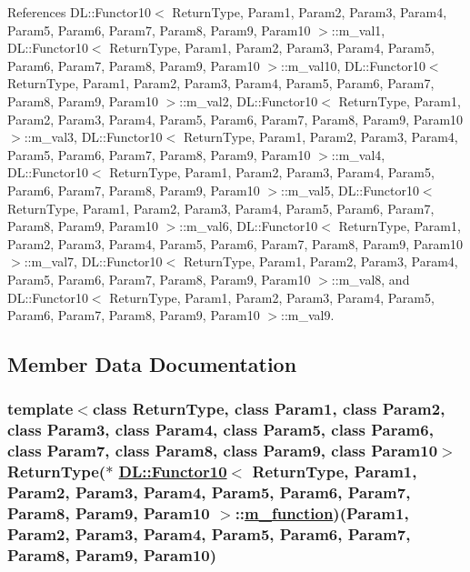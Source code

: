 References DL::Functor10$<$ Return\-Type, Param1, Param2, Param3, Param4, Param5, Param6, Param7, Param8, Param9, Param10 $>$::m\_\-val1, DL::Functor10$<$ Return\-Type, Param1, Param2, Param3, Param4, Param5, Param6, Param7, Param8, Param9, Param10 $>$::m\_\-val10, DL::Functor10$<$ Return\-Type, Param1, Param2, Param3, Param4, Param5, Param6, Param7, Param8, Param9, Param10 $>$::m\_\-val2, DL::Functor10$<$ Return\-Type, Param1, Param2, Param3, Param4, Param5, Param6, Param7, Param8, Param9, Param10 $>$::m\_\-val3, DL::Functor10$<$ Return\-Type, Param1, Param2, Param3, Param4, Param5, Param6, Param7, Param8, Param9, Param10 $>$::m\_\-val4, DL::Functor10$<$ Return\-Type, Param1, Param2, Param3, Param4, Param5, Param6, Param7, Param8, Param9, Param10 $>$::m\_\-val5, DL::Functor10$<$ Return\-Type, Param1, Param2, Param3, Param4, Param5, Param6, Param7, Param8, Param9, Param10 $>$::m\_\-val6, DL::Functor10$<$ Return\-Type, Param1, Param2, Param3, Param4, Param5, Param6, Param7, Param8, Param9, Param10 $>$::m\_\-val7, DL::Functor10$<$ Return\-Type, Param1, Param2, Param3, Param4, Param5, Param6, Param7, Param8, Param9, Param10 $>$::m\_\-val8, and DL::Functor10$<$ Return\-Type, Param1, Param2, Param3, Param4, Param5, Param6, Param7, Param8, Param9, Param10 $>$::m\_\-val9.

\subsection{Member Data Documentation}
\hypertarget{classDL_1_1Functor10_r0}{
\subsubsection[m\_\-function]{\setlength{\rightskip}{0pt plus 5cm}template$<$class Return\-Type, class Param1, class Param2, class Param3, class Param4, class Param5, class Param6, class Param7, class Param8, class Param9, class Param10$>$ Return\-Type($\ast$ \hyperlink{classDL_1_1Functor10}{DL::Functor10}$<$ Return\-Type, Param1, Param2, Param3, Param4, Param5, Param6, Param7, Param8, Param9, Param10 $>$::\hyperlink{classDL_1_1Functor10_r0}{m\_\-function})(Param1, Param2, Param3, Param4, Param5, Param6, Param7, Param8, Param9, Param10)}}
\label{classDL_1_1Functor10_r0}




